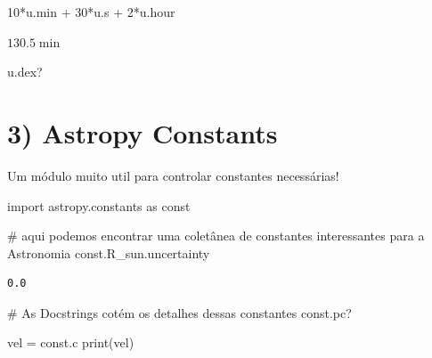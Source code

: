 \documentclass[
  letterpaper,
  DIV=11,
  numbers=noendperiod]{scrreprt}
\newenvironment{Shaded}{\begin{snugshade}}{\end{snugshade}}
\newcommand{\BuiltInTok}[1]{\textcolor[rgb]{0.00,0.23,0.31}{#1}}
\newcommand{\CommentTok}[1]{\textcolor[rgb]{0.37,0.37,0.37}{#1}}
\newcommand{\DecValTok}[1]{\textcolor[rgb]{0.68,0.00,0.00}{#1}}
\newcommand{\ImportTok}[1]{\textcolor[rgb]{0.00,0.46,0.62}{#1}}
\newcommand{\NormalTok}[1]{\textcolor[rgb]{0.00,0.23,0.31}{#1}}
\newcommand{\OperatorTok}[1]{\textcolor[rgb]{0.37,0.37,0.37}{#1}}
\begin{document}
\begin{Shaded}
\begin{Highlighting}[]
\DecValTok{10}\OperatorTok{*}\NormalTok{u.}\BuiltInTok{min} \OperatorTok{+} \DecValTok{30}\OperatorTok{*}\NormalTok{u.s }\OperatorTok{+} \DecValTok{2}\OperatorTok{*}\NormalTok{u.hour}
\end{Highlighting}
\end{Shaded}

$130.5 \; \mathrm{min}$

\begin{Shaded}
\begin{Highlighting}[]
\NormalTok{u.dex?}
\end{Highlighting}
\end{Shaded}

\section{3) Astropy Constants}\label{astropy-constants}

Um módulo muito util para controlar constantes necessárias!

\begin{Shaded}
\begin{Highlighting}[]
\ImportTok{import}\NormalTok{ astropy.constants }\ImportTok{as}\NormalTok{ const}
\end{Highlighting}
\end{Shaded}

\begin{Shaded}
\begin{Highlighting}[]
\CommentTok{\# aqui podemos encontrar uma coletânea de constantes interessantes para a Astronomia}
\NormalTok{const.R\_sun.uncertainty}
\end{Highlighting}
\end{Shaded}

\begin{verbatim}
0.0
\end{verbatim}

\begin{Shaded}
\begin{Highlighting}[]
\CommentTok{\# As Docstrings cotém os detalhes dessas constantes}
\NormalTok{const.pc?}
\end{Highlighting}
\end{Shaded}

\begin{Shaded}
\begin{Highlighting}[]
\NormalTok{vel }\OperatorTok{=}\NormalTok{ const.c}
\BuiltInTok{print}\NormalTok{(vel)}
\end{Highlighting}
\end{Shaded}
\end{document}
